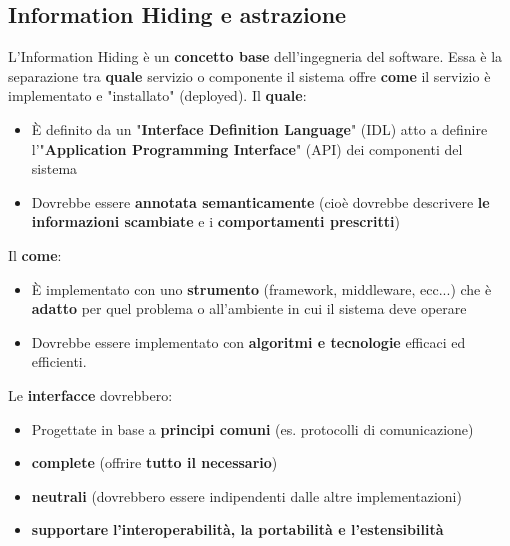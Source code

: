 \documentclass[12pt]{article}
\begin{document}
\subsection{Information Hiding e astrazione}
L'Information Hiding è un \textbf{concetto base} dell'ingegneria del software. Essa è la separazione tra \textbf{quale} servizio o componente il sistema offre \textbf{come} il servizio è implementato e "installato" (deployed). \newline
Il \textbf{quale}:
\begin{itemize}
    \item È definito da un "\textbf{Interface Definition Language}" (IDL) atto a definire l'"\textbf{Application Programming Interface}" (API) dei componenti del sistema
    \item Dovrebbe essere \textbf{annotata semanticamente} (cioè dovrebbe descrivere \textbf{le informazioni scambiate} e i \textbf{comportamenti prescritti})
\end{itemize}
Il \textbf{come}:
\begin{itemize}
    \item È implementato con uno \textbf{strumento} (framework, middleware, ecc...) che è \textbf{adatto} per quel problema o all'ambiente in cui il sistema deve operare
    \item Dovrebbe essere implementato con \textbf{algoritmi e tecnologie} efficaci ed efficienti.
\end{itemize}
Le \textbf{interfacce} dovrebbero:
\begin{itemize}
    \item Progettate in base a \textbf{principi comuni} (es. protocolli di comunicazione)
    \item \textbf{complete} (offrire \textbf{tutto il necessario})
    \item \textbf{neutrali} (dovrebbero essere indipendenti dalle altre implementazioni)
    \item \textbf{supportare} \textbf{l'interoperabilità, la portabilità e l'estensibilità}
\end{itemize}
\end{document}
